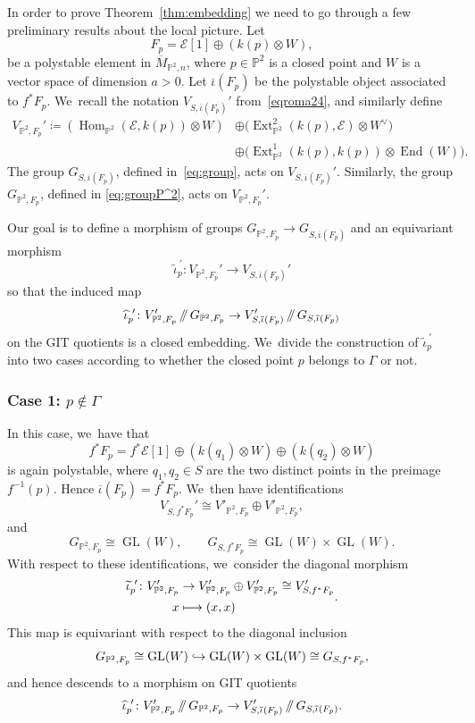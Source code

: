 \documentclass[11pt]{article}
\newcommand\mto{\mathchoice{\longmapsto}{\mapsto}{\mapsto}{\mapsto}}
\newcommand\hto{\mathrel{\lhook\joinrel\to}}
\providecommand\sslash{\mathop{/\mkern-5.5mu/}}
\newcommand{\PP}{{\mathbb P}}\let\P\PP
\newcommand\cE{\mathcal{E}}
\DeclareMathOperator{\End}{End}
\DeclareMathOperator{\Ext}{Ext}
\DeclareMathOperator{\GL}{GL}
\DeclareMathOperator{\Hom}{Hom}
\theoremstyle{definition}
\begin{document}
In order to prove Theorem~\ref{thm:embedding} we need to go through a few preliminary results about the local picture.
Let
\[
F_p = \cE[1] \oplus(k(p)\otimes W),
\]
be a polystable element in $\overline{M}_{\PP^2,n}$, where $p\in \PP^2$ is a closed point and $W$ is a vector space of dimension $a>0$.
Let $\overline{\iota}(F_p)$ be the polystable object associated to $f^*F_p$. We~recall the notation $V_{S,\overline{\iota}(F_p)}'$ from~\eqref{eqroma24}, and similarly define
\begin{equation}\label{eq:VPprime}
\begin{split}
V_{\PP^2,F_p}' \coloneqq \left(\Hom_{\PP^2}(\cE,k(p))\otimes W\right) &\oplus \bigl(\Ext^2_{\PP^2}(k(p),\cE)\otimes W^\vee\bigr)\\
&\oplus \bigl(\Ext^1_{\PP^2}(k(p),k(p))\otimes \End(W)\bigr).
\end{split}
\end{equation}
The group $G_{S,\overline{\iota}(F_p)}$, defined in~\eqref{eq:group}, acts on $V_{S,\overline{\iota}(F_p)}'$. Similarly, the group $G_{\PP^2,F_p}$, defined in \eqref{eq:groupP^2}, acts on $V_{\PP^2,F_p}'$.

Our goal is to define a morphism of groups $G_{\PP^2,F_p}\to G_{S,\overline{\iota}(F_p)}$ and an equivariant morphism
\[
\widetilde{\iota}_p^{\ \prime}\colon V_{\PP^2,F_p}'\to V_{S,\overline{\iota}(F_p)}'
\]
so that the induced map
\[
\widehat{\iota}_p^{\ \prime}\colon V_{\PP^2,F_p}'\sslash G_{\P^2,F_p} \to V_{S,\overline{\iota}(F_p)}'\sslash G_{S,\overline{\iota}(F_p)}
\]
on the GIT quotients is a closed embedding. We~divide the construction of $\widetilde{\iota}_p^{\ \prime}$ into two cases according to whether the closed point $p$ belongs to $\mathsf{\Gamma}$ or not.

\subsubsection*{Case 1: $p\not\in\mathsf{\Gamma}$}
In this case, we~have that
\[
f^*F_p=f^*\cE [1] \oplus \left(k(q_1)\otimes W \right) \oplus \left(k(q_2)\otimes W \right)
\]
is again polystable, where $q_1,q_2\in S$ are the two distinct points in the preimage $f^{-1}(p)$. Hence $\overline{\iota}(F_p)=f^*F_p$. We~then have identifications
\[
V_{S,f^*F_p}' \cong V'_{\PP^2,F_p} \oplus V'_{\PP^2,F_p},
\]
and
\[
G_{\P^2,F_p}\cong \GL(W), \qquad G_{S,f^*F_p} \cong \GL(W) \times \GL(W).
\]
With respect to these identifications, we~consider the diagonal morphism
\begin{equation}\label{eq:DefOfIotaTilde}
\begin{aligned}
\widetilde{\iota}_p^{\ \prime}\colon V'_{\PP^2,F_p} & \to V'_{\PP^2,F_p} \oplus V'_{\PP^2,F_p} \cong V_{S,f^*F_p}' \\
\ x & \mto (x,x)
\end{aligned}.
\end{equation}
This map is equivariant with respect to the diagonal inclusion
\[
G_{\P^2,F_p}\cong \GL(W) \hto \GL(W) \times \GL(W) \cong G_{S,f^*F_p},
\]
and hence descends to a morphism on GIT quotients
\[
\widehat{\iota}_p^{\ \prime} \colon V_{\PP^2,F_p}'\sslash G_{\P^2,F_p} \to V_{S,\overline{\iota}(F_p)}'\sslash G_{S,\overline{\iota}(F_p)}.
\]
\end{document}

